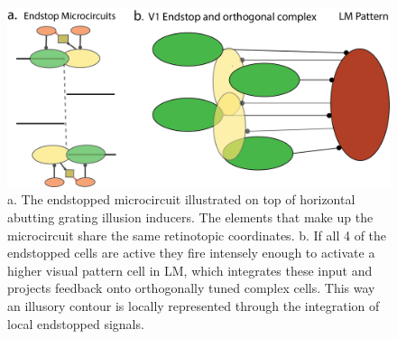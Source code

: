 \documentclass[12pt]{article}
\begin{document}
\begin{figure}[H]
  \centering
  \includegraphics[width=1 \textwidth]{adjusted_figures/illusory_filling.png}
  \caption{a. The endstopped microcircuit illustrated on top of horizontal abutting grating illusion inducers. The elements that make up the microcircuit share the same retinotopic coordinates. b. If all 4 of the endstopped cells are active they fire intensely enough to activate a higher visual pattern cell in LM, which integrates these input and projects feedback onto orthogonally tuned complex cells. This way an illusory contour is locally represented through the integration of local endstopped signals.}
  \label{fig:illusory_filling}
\end{figure}
\end{document}
